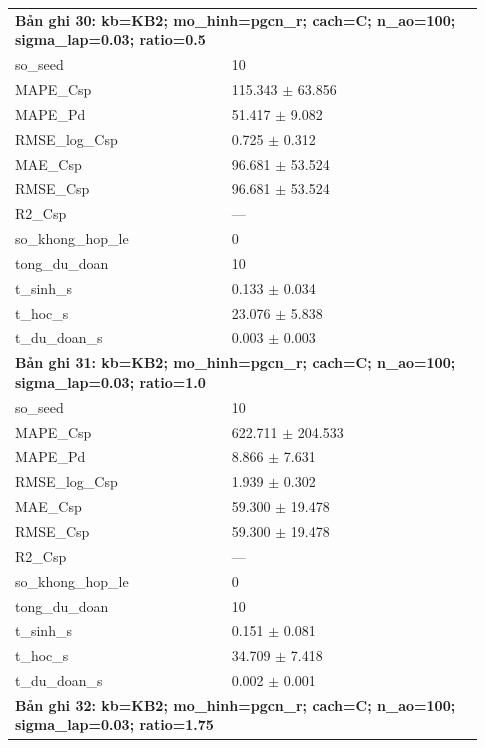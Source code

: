 \begin{longtable}{p{0.43\linewidth}p{0.50\linewidth}}
\midrule
\multicolumn{2}{p{0.95\linewidth}}{\textbf{Bản ghi 30: kb=KB2; mo\_hinh=pgcn\_r; cach=C; n\_ao=100; sigma\_lap=0.03; ratio=0.5}} \\
so\_\allowbreak seed & 10 \\
MAPE\_\allowbreak Csp & 115.343 $\pm$ 63.856 \\
MAPE\_\allowbreak Pd & 51.417 $\pm$ 9.082 \\
RMSE\_\allowbreak log\_\allowbreak Csp & 0.725 $\pm$ 0.312 \\
MAE\_\allowbreak Csp & 96.681 $\pm$ 53.524 \\
RMSE\_\allowbreak Csp & 96.681 $\pm$ 53.524 \\
R2\_\allowbreak Csp & — \\
so\_\allowbreak khong\_\allowbreak hop\_\allowbreak le & 0 \\
tong\_\allowbreak du\_\allowbreak doan & 10 \\
t\_\allowbreak sinh\_\allowbreak s & 0.133 $\pm$ 0.034 \\
t\_\allowbreak hoc\_\allowbreak s & 23.076 $\pm$ 5.838 \\
t\_\allowbreak du\_\allowbreak doan\_\allowbreak s & 0.003 $\pm$ 0.003 \\
\midrule
\multicolumn{2}{p{0.95\linewidth}}{\textbf{Bản ghi 31: kb=KB2; mo\_hinh=pgcn\_r; cach=C; n\_ao=100; sigma\_lap=0.03; ratio=1.0}} \\
so\_\allowbreak seed & 10 \\
MAPE\_\allowbreak Csp & 622.711 $\pm$ 204.533 \\
MAPE\_\allowbreak Pd & 8.866 $\pm$ 7.631 \\
RMSE\_\allowbreak log\_\allowbreak Csp & 1.939 $\pm$ 0.302 \\
MAE\_\allowbreak Csp & 59.300 $\pm$ 19.478 \\
RMSE\_\allowbreak Csp & 59.300 $\pm$ 19.478 \\
R2\_\allowbreak Csp & — \\
so\_\allowbreak khong\_\allowbreak hop\_\allowbreak le & 0 \\
tong\_\allowbreak du\_\allowbreak doan & 10 \\
t\_\allowbreak sinh\_\allowbreak s & 0.151 $\pm$ 0.081 \\
t\_\allowbreak hoc\_\allowbreak s & 34.709 $\pm$ 7.418 \\
t\_\allowbreak du\_\allowbreak doan\_\allowbreak s & 0.002 $\pm$ 0.001 \\
\midrule
\multicolumn{2}{p{0.95\linewidth}}{\textbf{Bản ghi 32: kb=KB2; mo\_hinh=pgcn\_r; cach=C; n\_ao=100; sigma\_lap=0.03; ratio=1.75}} \\

\end{longtable}
